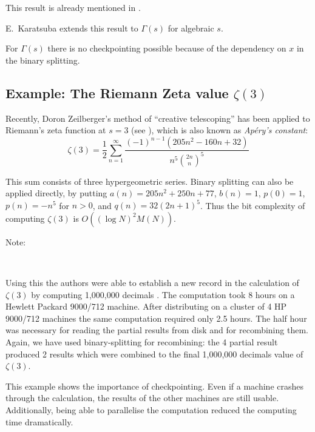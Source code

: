This result is already mentioned in \cite{76b}.

E.~Karatsuba \cite{91} extends this result to \( \Gamma (s) \) for algebraic
\( s \).

For \( \Gamma (s) \) there is no checkpointing possible because of the
dependency on \( x \) in the binary splitting.


\subsection{Example: The Riemann Zeta value \( \zeta (3) \) \label{zeta}}

Recently, Doron Zeilberger's method of ``creative telescoping'' has been
applied to Riemann's zeta function at  \( s=3 \) (see \cite{96c}), which is
also known as {\em Ap{\'e}ry's constant}: 
\[
\zeta (3)=
\frac{1}{2}\sum ^{\infty }_{n=1}
               \frac{(-1)^{n-1}(205n^{2}-160n+32)}{n^{5}{2n \choose n}^{5}}
\]

This sum consists of three hypergeometric series. Binary splitting can also be
applied directly, by putting  \( a(n)=205n^{2}+250n+77 \), \( b(n)=1 \),
\( p(0)=1 \), \( p(n)=-n^{5} \) for  \( n>0 \), and \( q(n)=32(2n+1)^{5} \).
Thus the bit complexity of computing \( \zeta (3) \) is
\( O((\log N)^{2}M(N)) \).

\begin{description}
\item [Note:]~
\end{description}

Using this the authors were able to establish a new record in the
calculation of \( \zeta (3) \) by computing 1,000,000 decimals \cite{96d}.
The computation took 8 hours on a Hewlett Packard 9000/712 machine. After
distributing on a cluster of 4 HP 9000/712 machines the same computation
required only 2.5 hours. The half hour was necessary for reading the partial
results from disk and for recombining them. Again, we have used binary-splitting
for recombining: the 4 partial result produced 2 results which were combined
to the final 1,000,000 decimals value of \( \zeta (3) \).

This example shows the importance of checkpointing. Even if a machine crashes
through the calculation, the results of the other machines are still usable.
Additionally, being able to parallelise the computation reduced the computing
time dramatically.

